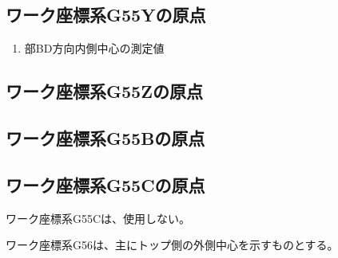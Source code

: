 \subsection{ワーク座標系{\ttfamily G55Y}の原点}
\begin{enumerate}[label*=\sarrow]
\item \BottomEndFace 部BD方向内側中心の測定値
\end{enumerate}


\subsection{ワーク座標系{\ttfamily G55Z}の原点\TBW}


\subsection{ワーク座標系{\ttfamily G55B}の原点\TBW}


\subsection{ワーク座標系{\ttfamily G55C}の原点}
ワーク座標系{\ttfamily G55C}は、使用しない。



ワーク座標系{\ttfamily G56}は、主にトップ側の外側中心を示すものとする。


